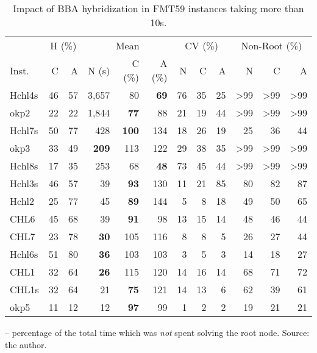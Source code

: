 \documentclass[ppgc,tese,english,formais,babel]{iiufrgs}
\newcommand{\bestcolumnemph}[1]{\textbf{#1}}
\begin{document}
\begin{table}
\caption{Impact of BBA hybridization in FMT59 instances taking more than 10s.}
\label{tab:g2kp_hyb_selected_instances}
\begin{center}
\begin{tabular}{lrrrrrrrrrrr}
\hline\hline
& \multicolumn{2}{c}{H (\%)} & \multicolumn{3}{c}{Mean} & \multicolumn{3}{c}{CV (\%)} & \multicolumn{3}{c}{Non-Root (\%)} \\\cmidrule(lr){2-3}\cmidrule(lr){4-6}\cmidrule(lr){7-9}\cmidrule(lr){10-12}
Inst. & C & A & N (s) & C (\%) & A (\%) & N & C & A & N & C & A \\\hline\hline
Hchl4s & 46 & 57 & 3,657 & 80 & \bestcolumnemph{69} & 76 & 35 & 25 & >99 & >99 & >99 \\
okp2 & 22 & 22 & 1,844 & \bestcolumnemph{77} & 88 & 21 & 19 & 44 & >99 & >99 & >99 \\
Hchl7s & 50 & 77 & 428 & \bestcolumnemph{100} & 134 & 18 & 26 & 19 & 25 & 36 & 44 \\
okp3 & 33 & 49 & \bestcolumnemph{209} & 113 & 122 & 29 & 38 & 35 & >99 & >99 & >99 \\
Hchl8s & 17 & 35 & 253 & 68 & \bestcolumnemph{48} & 73 & 45 & 44 & >99 & >99 & >99 \\
Hchl3s & 46 & 57 & 39 & \bestcolumnemph{93} & 130 & 11 & 21 & 85 & 80 & 82 & 87 \\
Hchl2 & 25 & 77 & 45 & \bestcolumnemph{89} & 144 & 5 & 8 & 18 & 49 & 50 & 65 \\
CHL6 & 45 & 68 & 39 & \bestcolumnemph{91} & 98 & 13 & 15 & 14 & 48 & 46 & 44 \\
CHL7 & 23 & 78 & \bestcolumnemph{30} & 105 & 116 & 8 & 8 & 5 & 26 & 27 & 44 \\
Hchl6s & 51 & 80 & \bestcolumnemph{36} & 103 & 103 & 3 & 5 & 3 & 14 & 18 & 27 \\
CHL1 & 32 & 64 & \bestcolumnemph{26} & 115 & 120 & 14 & 16 & 14 & 68 & 71 & 72 \\
CHL1s & 32 & 64 & 21 & \bestcolumnemph{75} & 121 & 14 & 13 & 6 & 62 & 39 & 61 \\
okp5 & 11 & 12 & 12 & \bestcolumnemph{97} & 99 & 1 & 2 & 2 & 19 & 21 & 21 \\\hline\hline
\end{tabular}
\end{center}
 -- percentage of the total time which was \emph{not} spent solving the root node. Source: the author.
\end{table}
\end{document}
